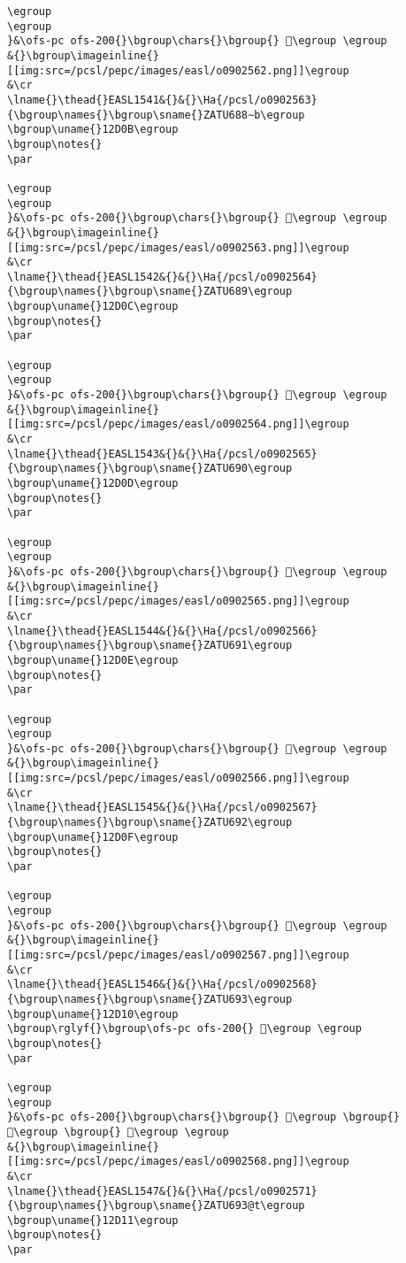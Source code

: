 \begin{verbatim}
\egroup
\egroup
}&\ofs-pc ofs-200{}\bgroup\chars{}\bgroup{} 𒴊\egroup \egroup
&{}\bgroup\imageinline{}[[img:src=/pcsl/pepc/images/easl/o0902562.png]]\egroup
&\cr
\lname{}\thead{}EASL1541&{}&{}\Ha{/pcsl/o0902563}{\bgroup\names{}\bgroup\sname{}ZATU688∼b\egroup
\bgroup\uname{}12D0B\egroup
\bgroup\notes{}
\par 

\egroup
\egroup
}&\ofs-pc ofs-200{}\bgroup\chars{}\bgroup{} 𒴋\egroup \egroup
&{}\bgroup\imageinline{}[[img:src=/pcsl/pepc/images/easl/o0902563.png]]\egroup
&\cr
\lname{}\thead{}EASL1542&{}&{}\Ha{/pcsl/o0902564}{\bgroup\names{}\bgroup\sname{}ZATU689\egroup
\bgroup\uname{}12D0C\egroup
\bgroup\notes{}
\par 

\egroup
\egroup
}&\ofs-pc ofs-200{}\bgroup\chars{}\bgroup{} 𒴌\egroup \egroup
&{}\bgroup\imageinline{}[[img:src=/pcsl/pepc/images/easl/o0902564.png]]\egroup
&\cr
\lname{}\thead{}EASL1543&{}&{}\Ha{/pcsl/o0902565}{\bgroup\names{}\bgroup\sname{}ZATU690\egroup
\bgroup\uname{}12D0D\egroup
\bgroup\notes{}
\par 

\egroup
\egroup
}&\ofs-pc ofs-200{}\bgroup\chars{}\bgroup{} 𒴍\egroup \egroup
&{}\bgroup\imageinline{}[[img:src=/pcsl/pepc/images/easl/o0902565.png]]\egroup
&\cr
\lname{}\thead{}EASL1544&{}&{}\Ha{/pcsl/o0902566}{\bgroup\names{}\bgroup\sname{}ZATU691\egroup
\bgroup\uname{}12D0E\egroup
\bgroup\notes{}
\par 

\egroup
\egroup
}&\ofs-pc ofs-200{}\bgroup\chars{}\bgroup{} 𒴎\egroup \egroup
&{}\bgroup\imageinline{}[[img:src=/pcsl/pepc/images/easl/o0902566.png]]\egroup
&\cr
\lname{}\thead{}EASL1545&{}&{}\Ha{/pcsl/o0902567}{\bgroup\names{}\bgroup\sname{}ZATU692\egroup
\bgroup\uname{}12D0F\egroup
\bgroup\notes{}
\par 

\egroup
\egroup
}&\ofs-pc ofs-200{}\bgroup\chars{}\bgroup{} 𒴏\egroup \egroup
&{}\bgroup\imageinline{}[[img:src=/pcsl/pepc/images/easl/o0902567.png]]\egroup
&\cr
\lname{}\thead{}EASL1546&{}&{}\Ha{/pcsl/o0902568}{\bgroup\names{}\bgroup\sname{}ZATU693\egroup
\bgroup\uname{}12D10\egroup
\bgroup\rglyf{}\bgroup\ofs-pc ofs-200{} 𒴐\egroup \egroup
\bgroup\notes{}
\par 

\egroup
\egroup
}&\ofs-pc ofs-200{}\bgroup\chars{}\bgroup{} 𒴐\egroup \bgroup{} 𒴒\egroup \bgroup{} 𒴓\egroup \egroup
&{}\bgroup\imageinline{}[[img:src=/pcsl/pepc/images/easl/o0902568.png]]\egroup
&\cr
\lname{}\thead{}EASL1547&{}&{}\Ha{/pcsl/o0902571}{\bgroup\names{}\bgroup\sname{}ZATU693@t\egroup
\bgroup\uname{}12D11\egroup
\bgroup\notes{}
\par 


\end{verbatim}
